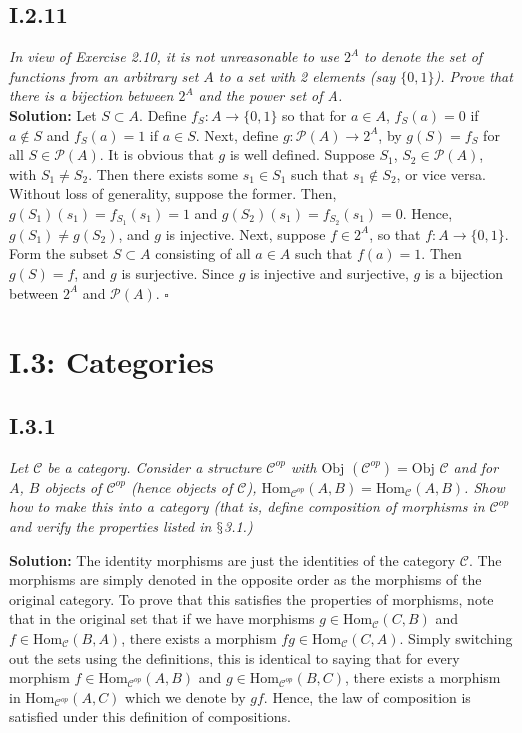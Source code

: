 \documentclass[11pt,a4paper]{article}
\begin{document}
\subsection*{I.2.11}\textit{In view of Exercise 2.10, it is not unreasonable to use $2^A$ to denote the set of functions from an arbitrary set $A$ to a set with 2 elements (say $\{0,1\}$). Prove that there is a bijection between $2^A$ and the power set of A.} \\

\noindent \textbf{Solution: }Let $S \subset A$. Define $f_S: A \rightarrow \{0,1\}$ so that for $a \in A$, $f_S(a) = 0$ if $a \notin S$ and $f_S(a) = 1$ if $a \in S$.  Next, define $g: \mathscr{P}(A) \rightarrow 2^A$, by $g(S) = f_S$ for all $S \in \mathscr{P}(A)$.  It is obvious that $g$ is well defined.  Suppose $S_1$, $S_2 \in \mathscr{P}(A)$, with $S_1 \neq S_2$.  Then there exists some $s_1 \in S_1$ such that $s_1 \notin S_2$, or vice versa. Without loss of generality, suppose the former.  Then, $g(S_1)(s_1)=f_{S_1}(s_1) = 1$ and $g(S_2)(s_1)=f_{S_2}(s_1) = 0$.  Hence, $g(S_1) \neq g(S_2)$, and $g$ is injective.  Next, suppose $f \in 2^A$, so that $f:A \rightarrow \{0,1\}$.  Form the subset $S \subset A$ consisting of all $a \in A$ such that $f(a) = 1$.  Then $g(S) = f$, and $g$ is surjective.  Since $g$ is injective and surjective, $g$ is a bijection between $2^A$ and $\mathscr{P}(A)$. $\square$

\newpage

\section*{I.3: Categories}

\subsection*{I.3.1}\textit{Let $\mathcal{C}$ be a category.  Consider a structure $\mathcal{C}^{op}$ with $\text{Obj }(\mathcal{C}^{op})= \text{Obj }\mathcal{C}$ and for $A$, $B$ objects of $\mathcal{C}^{op}$ (hence objects of $\mathcal{C}$), $\text{Hom}_{\mathcal{C}^{op}}(A,B) = \text{Hom}_{\mathcal{C}}(A,B)$.  Show how to make this into a category (that is, define composition of morphisms in $\mathcal{C}^{op}$ and verify the properties listed in $\mathsection$3.1.)}

\noindent \textbf{Solution: }The identity morphisms are just the identities of the category $\mathcal{C}$.  The morphisms are simply denoted in the opposite order as the morphisms of the original category.  To prove that this satisfies the properties of morphisms, note that in the original set that if we have morphisms $g \in \text{Hom}_{\mathcal{C}}(C,B)$ and $f \in \text{Hom}_{\mathcal{C}}(B,A)$, there exists a morphism $fg \in \text{Hom}_{\mathcal{C}}(C,A)$.  Simply switching out the sets using the definitions, this is identical to saying that for every morphism $f \in \text{Hom}_{\mathcal{C}^{op}}(A,B)$ and $g \in \text{Hom}_{\mathcal{C}^{op}}(B,C)$, there exists a morphism in $\text{Hom}_{\mathcal{C}^{op}}(A,C)$ which we denote by $gf$.  Hence, the law of composition is satisfied under this definition of compositions.  \\
\end{document}
